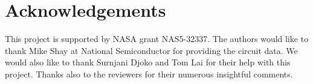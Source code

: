 \section*{Acknowledgements}

This project is supported by NASA grant NAS5-32337.
The authors would like to thank Mike Shay at National Semiconductor for
providing the circuit data.  We would also like to thank Surnjani Djoko
and Tom Lai for their help with this project.  Thanks also to the reviewers
for their numerous insightful comments.







